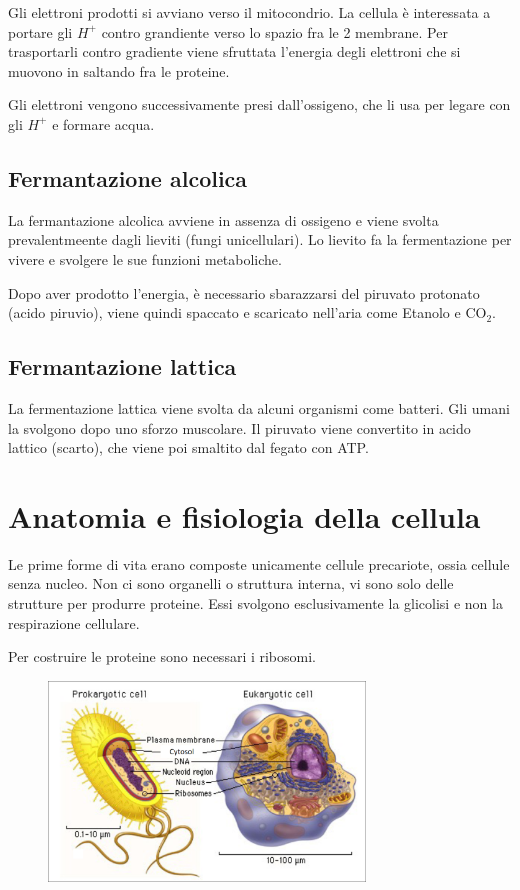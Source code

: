 \documentclass[a4paper]{article}
\begin{document}
Gli elettroni prodotti si avviano verso il mitocondrio. La cellula è interessata a portare
gli \(H^+\) contro grandiente verso lo spazio fra le 2 membrane.
Per trasportarli contro gradiente viene sfruttata l'energia degli elettroni che si muovono in saltando fra le proteine.

Gli elettroni vengono successivamente presi dall'ossigeno, che li usa per legare con gli \(H^+\) e formare
acqua.

\subsection{Fermantazione alcolica}

La fermantazione alcolica avviene in assenza di ossigeno e viene svolta prevalentmeente dagli lieviti (fungi unicellulari).
Lo lievito fa la fermentazione per vivere e svolgere le sue funzioni metaboliche.

Dopo aver prodotto l'energia, è necessario sbarazzarsi del piruvato protonato (acido piruvio),
viene quindi spaccato e scaricato nell'aria come Etanolo e CO\({}_2\).

\subsection{Fermantazione lattica}

La fermentazione lattica viene svolta da alcuni organismi come batteri.
Gli umani la svolgono dopo uno sforzo muscolare.
Il piruvato viene convertito in acido lattico (scarto), che viene poi smaltito dal fegato con ATP.

\pagebreak

\section{Anatomia e fisiologia della cellula}

Le prime forme di vita erano composte unicamente cellule precariote, ossia cellule 
senza nucleo. Non ci sono organelli o struttura interna, vi sono solo delle strutture
per produrre proteine.
Essi svolgono esclusivamente la glicolisi e non la respirazione cellulare.

Per costruire le proteine sono necessari i ribosomi.

\begin{figure}[th]
    \centering
    \includegraphics[width=0.75\textwidth]{./prok-euka.png}
\end{figure}
\end{document}
